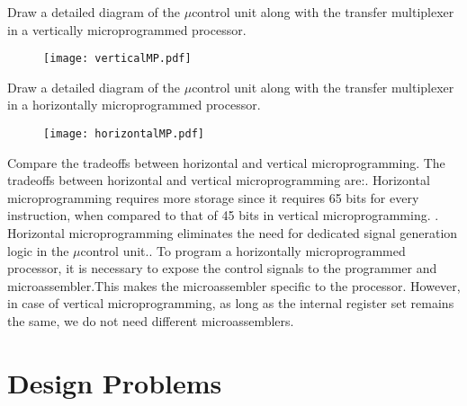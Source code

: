 \begin{ExerciseList}
\Exercise
Draw a detailed diagram of the $\mu$control unit along with the transfer multiplexer in a vertically microprogrammed
processor.
\begin{figure}[H]
  \centering
  \texttt{[image: verticalMP.pdf]}
\end{figure}
\Exercise
Draw a detailed diagram of the $\mu$control unit along with the transfer multiplexer in a horizontally microprogrammed
processor.
\begin{figure}[H]
  \centering
  \texttt{[image: horizontalMP.pdf]}
\end{figure}
\Exercise Compare the tradeoffs between horizontal and vertical microprogramming.
\Answer The tradeoffs between horizontal and vertical microprogramming are:. Horizontal microprogramming requires more storage since it requires 65 bits for every instruction, when compared to that of 45 bits in vertical microprogramming. . Horizontal microprogramming eliminates the need for dedicated signal generation logic in the $\mu$control unit.. To program a horizontally microprogrammed processor, it is necessary to expose the control signals to the programmer and microassembler.This makes the microassembler specific to the processor. However, in case of vertical microprogramming, as long as the internal register set remains the same, we do not need different microassemblers.\newline
\end{ExerciseList}

\section*{Design Problems}

